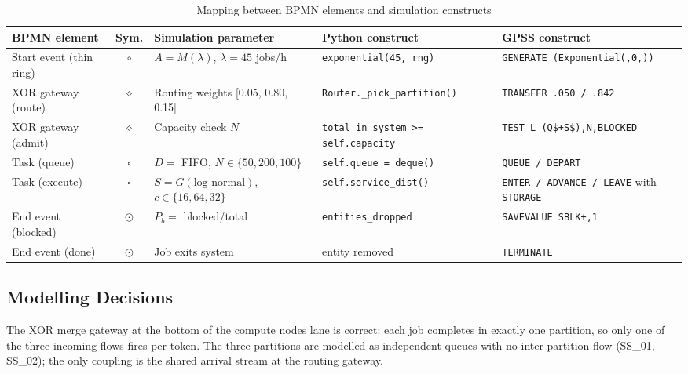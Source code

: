 \documentclass[11pt,a4paper]{article}
\newcommand{\Pb}{\ensuremath{P_b}}
\newcommand{\lam}{\ensuremath{\lambda}}
\begin{document}
\begin{table}[H]
\centering
\caption{Mapping between BPMN elements and simulation constructs}
\footnotesize
\begin{tabularx}{\linewidth}{@{}L{2.3cm}c L{2.4cm} X X@{}}
\toprule
\textbf{BPMN element} & \textbf{Sym.} & \textbf{Simulation parameter} & \textbf{Python construct} & \textbf{GPSS construct} \\
\midrule
Start event (thin ring) & $\circ$  & $A = M(\lam)$, $\lam=45$ jobs/h      & \texttt{exponential(45, rng)}                  & \texttt{GENERATE (Exponential(,0,))} \\[3pt]
XOR gateway (route)     & $\diamond$ & Routing weights [0.05, 0.80, 0.15] & \texttt{Router.\_pick\_partition()}            & \texttt{TRANSFER .050 / .842} \\[3pt]
XOR gateway (admit)     & $\diamond$ & Capacity check $N$                 & \texttt{total\_in\_system >= self.capacity}    & \texttt{TEST L (Q\$+S\$),N,BLOCKED} \\[3pt]
Task (queue)            & $\square$ & $D=$ FIFO, $N \in \{50,200,100\}$  & \texttt{self.queue = deque()}                  & \texttt{QUEUE / DEPART} \\[3pt]
Task (execute)          & $\square$ & $S=G(\text{log-normal})$, $c \in \{16,64,32\}$ & \texttt{self.service\_dist()}      & \texttt{ENTER / ADVANCE / LEAVE} with \texttt{STORAGE} \\[3pt]
End event (blocked)     & $\odot$  & $\Pb =$ blocked/total              & \texttt{entities\_dropped}                     & \texttt{SAVEVALUE SBLK+,1} \\[3pt]
End event (done)        & $\odot$  & Job exits system                   & entity removed                                 & \texttt{TERMINATE} \\
\bottomrule
\end{tabularx}
\end{table}

\subsection{Modelling Decisions}

The XOR merge gateway at the bottom of the compute nodes lane is correct: each job completes in exactly
one partition, so only one of the three incoming flows fires per token. The three partitions are modelled
as independent queues with no inter-partition flow (SS\_01, SS\_02); the only coupling is the shared
arrival stream at the routing gateway.
\end{document}
